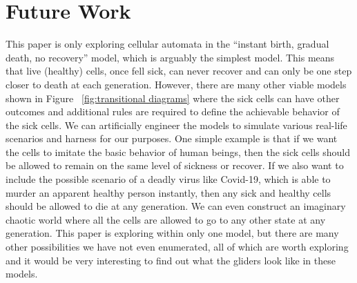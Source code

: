 \documentclass[12pt]{article}
\numberwithin{figure}{section} %
\begin{document}
\newpage
\section{Future Work}
This paper is only exploring cellular automata in the “instant birth, gradual death, no recovery” model, which is arguably the simplest model. This means that live (healthy) cells, once fell sick, can never recover and can only be one step closer to death at each generation. However, there are many other viable models shown in Figure ~\ref{fig:transitional diagrams} where the sick cells can have other outcomes and additional rules are required to define the achievable behavior of the sick cells. We can artificially engineer the models to simulate various real-life scenarios and harness for our purposes. One simple example is that if we want the cells to imitate the basic behavior of human beings, then the sick cells should be allowed to remain on the same level of sickness or recover. If we also want to include the possible scenario of a deadly virus like Covid-19, which is able to murder an apparent healthy person instantly, then any sick and healthy cells should be allowed to die at any generation. We can even construct an imaginary chaotic world where all the cells are allowed to go to any other state at any generation. This paper is exploring within only one model, but there are many other possibilities we have not even enumerated, all of which are worth exploring and it would be very interesting to find out what the gliders look like in these models. 
\end{document}
